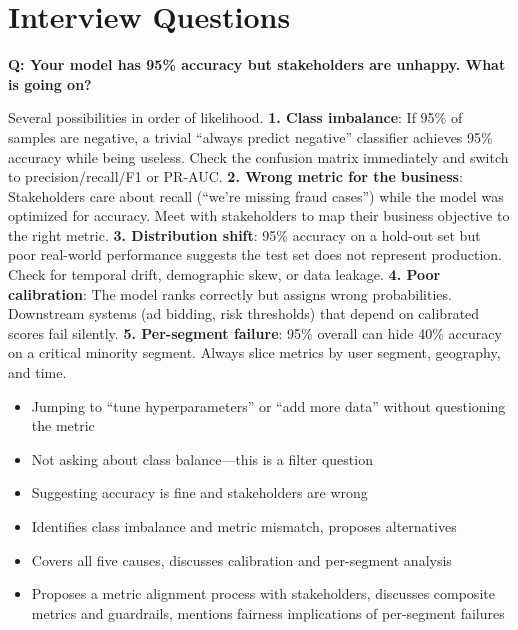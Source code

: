 \section{Interview Questions}
\label{sec:eval_interview_questions}

\begin{interviewq}
\textbf{Q: Your model has 95\% accuracy but stakeholders are unhappy. What is going on?}

 \quad {} \quad \badgefreq{\freqhigh}

\stronganswer Several possibilities in order of likelihood. \textbf{1. Class imbalance}: If 95\% of samples are negative, a trivial ``always predict negative'' classifier achieves 95\% accuracy while being useless. Check the confusion matrix immediately and switch to precision/recall/F1 or PR-AUC. \textbf{2. Wrong metric for the business}: Stakeholders care about recall (``we're missing fraud cases'') while the model was optimized for accuracy. Meet with stakeholders to map their business objective to the right metric. \textbf{3. Distribution shift}: 95\% accuracy on a hold-out set but poor real-world performance suggests the test set does not represent production. Check for temporal drift, demographic skew, or data leakage. \textbf{4. Poor calibration}: The model ranks correctly but assigns wrong probabilities. Downstream systems (ad bidding, risk thresholds) that depend on calibrated scores fail silently. \textbf{5. Per-segment failure}: 95\% overall can hide 40\% accuracy on a critical minority segment. Always slice metrics by user segment, geography, and time.

\redflags
\begin{itemize}
    \item Jumping to ``tune hyperparameters'' or ``add more data'' without questioning the metric
    \item Not asking about class balance---this is a filter question
    \item Suggesting accuracy is fine and stakeholders are wrong
\end{itemize}


\goodgreat
\begin{itemize}
    \item {} Identifies class imbalance and metric mismatch, proposes alternatives
    \item {} Covers all five causes, discusses calibration and per-segment analysis
    \item {} Proposes a metric alignment process with stakeholders, discusses composite metrics and guardrails, mentions fairness implications of per-segment failures
\end{itemize}


\end{interviewq}
